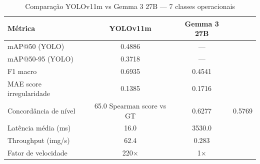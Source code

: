 \begin{table}[htbp]
\centering
\caption{Comparação YOLOv11m vs Gemma 3 27B — 7 classes operacionais}
\label{tab:comparacao_yolo_vlm}
\begin{tabular}{lcc}
\toprule
\textbf{Métrica} & \textbf{YOLOv11m} & \textbf{Gemma 3 27B} \\
\midrule
mAP@50 (YOLO) & 0.4886 & — \\
mAP@50-95 (YOLO) & 0.3718 & — \\
F1 macro & 0.6935 & 0.4541 \\
MAE score irregularidade & 0.1385 & 0.1716 \\
Concordância de nível & 65.0%
Spearman score vs GT & 0.6277 & 0.5769 \\
Latência média (ms) & 16.0 & 3530.0 \\
Throughput (img/s) & 62.4 & 0.283 \\
Fator de velocidade & 220× & 1× \\
\bottomrule
\end{tabular}
\end{table}
